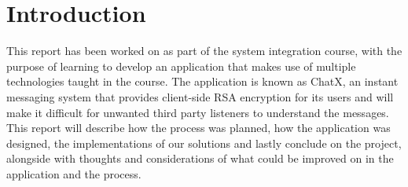 \section{Introduction}

This report has been worked on as part of the system integration course, with the purpose of learning to develop an application that makes use of multiple technologies taught in the course. The application is known as ChatX, an instant messaging system that provides client-side RSA encryption for its users and will make it difficult for unwanted third party listeners to understand the messages. This report will describe how the process was planned, how the application was designed, the implementations of our solutions and lastly conclude on the project, alongside with thoughts and considerations of what could be improved on in the application and the process.